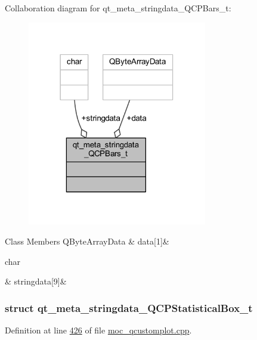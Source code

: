 Collaboration diagram for qt\+\_\+meta\+\_\+stringdata\+\_\+\+Q\+C\+P\+Bars\+\_\+t\+:
\nopagebreak
\begin{figure}[H]
\begin{center}
\leavevmode
\includegraphics[width=222pt]{d5/dcb/a00170}
\end{center}
\end{figure}
\begin{DoxyFields}{Class Members}
\hypertarget{a00016_a5237dfd2ea3d5be916ce7c562d734ff4}{Q\+Byte\+Array\+Data}\label{a00016_a5237dfd2ea3d5be916ce7c562d734ff4}
&
data\mbox{[}1\mbox{]}&
\\
\hline

\hypertarget{a00016_a07ece80e538a4239e2a3b6d4b9782407}{char}\label{a00016_a07ece80e538a4239e2a3b6d4b9782407}
&
stringdata\mbox{[}9\mbox{]}&
\\
\hline

\end{DoxyFields}
\label{d9/d4b/a00117}
\hypertarget{a00016_d9/d4b/a00117}{}
\subsubsection{struct qt\+\_\+meta\+\_\+stringdata\+\_\+\+Q\+C\+P\+Statistical\+Box\+\_\+t}


Definition at line \hyperlink{a00016_source_l00426}{426} of file \hyperlink{a00016_source}{moc\+\_\+qcustomplot.\+cpp}.



